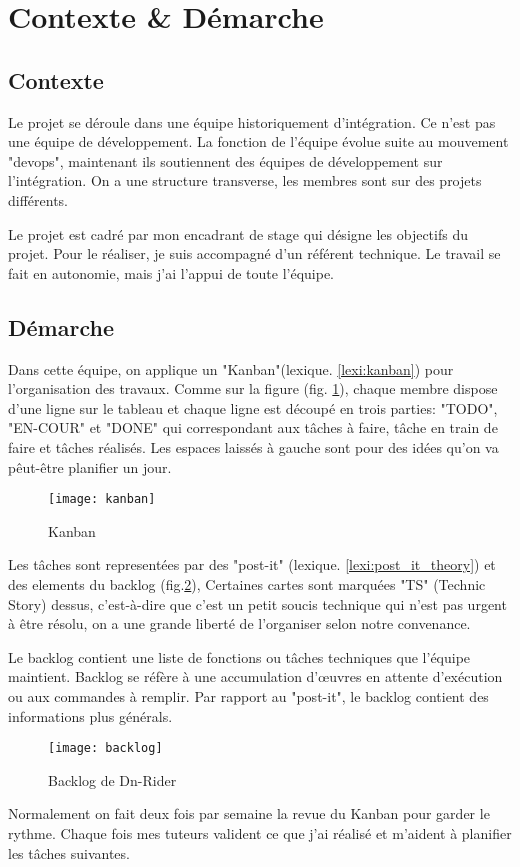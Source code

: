 \section{Contexte \& Démarche}
\subsection{Contexte}
Le projet se déroule dans une équipe historiquement d'intégration. Ce n'est pas une équipe de développement.
La fonction de l'équipe évolue suite au mouvement "devops", maintenant ils soutiennent des équipes de développement sur l'intégration.
On a une structure transverse, les membres sont sur des projets différents.

Le projet est cadré par mon encadrant de stage qui désigne les objectifs du projet.
Pour le réaliser, je suis accompagné d'un référent technique.
Le travail se fait en autonomie, mais j'ai l'appui de toute l'équipe.

\subsection{Démarche}
Dans cette équipe, on applique un "Kanban"(lexique. \ref{lexi:kanban}) pour l'organisation des travaux.
Comme sur la figure (fig. \ref{fig:kanban}), chaque membre dispose d'une ligne sur le tableau et chaque ligne est découpé en trois parties: "TODO", "EN-COUR" et "DONE" qui correspondant aux tâches à faire, tâche en train de faire et tâches réalisés.
Les espaces laissés à gauche sont pour des idées qu'on va pêut-être planifier un jour.

\begin{figure}[ht]
\centering
\texttt{[image: kanban]}
\caption{Kanban}
\label{fig:kanban}
\end{figure}

Les tâches sont representées par des "post-it" (lexique. \ref{lexi:post_it_theory}) et des elements du backlog (fig.\ref{fig:backlog}),
Certaines cartes sont marquées "TS" (Technic Story) dessus, c'est-à-dire que c'est un petit soucis technique qui n'est pas urgent à être résolu,
on a une grande liberté de l'organiser selon notre convenance.

Le backlog contient une liste de fonctions ou tâches techniques que l'équipe maintient.
Backlog se réfère à une accumulation d'œuvres en attente d'exécution ou aux commandes à remplir.
Par rapport au "post-it", le backlog contient des informations plus générals.

\begin{figure}[ht]
 \centering
 \texttt{[image: backlog]}
 \caption{Backlog de Dn-Rider}
 \label{fig:backlog}
\end{figure}

Normalement on fait  deux fois par semaine la revue du Kanban pour garder le rythme.
Chaque fois mes tuteurs valident ce que j'ai réalisé et m'aident à planifier les tâches suivantes.

\clearpage
